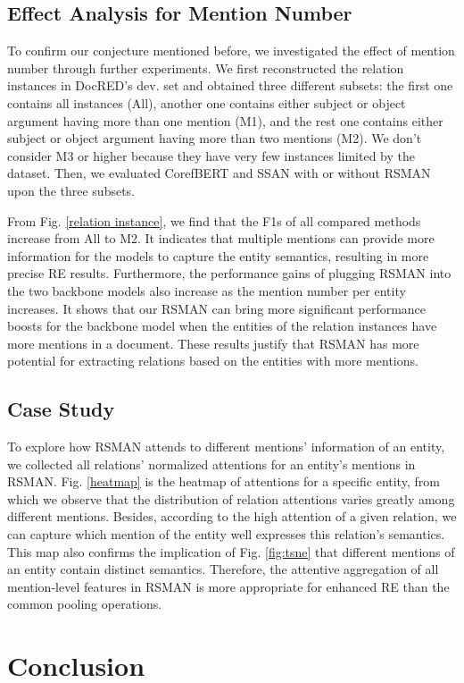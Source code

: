\documentclass[11pt]{article}
\begin{document}
\subsection{Effect Analysis for Mention Number}
To confirm our conjecture mentioned before, we investigated the effect of mention number through further experiments. We first reconstructed the relation instances in DocRED's dev. set and obtained three different subsets: the first one contains all instances (All), another one contains either subject or object argument having more than one mention (M1), and the rest one contains either subject or object argument having more than two mentions (M2). We don't consider M3 or higher because they have very few instances limited by the dataset. Then, we evaluated CorefBERT and SSAN with or without RSMAN upon the three subsets.

From Fig. \ref{relation instance}, we find that the F1s of all compared methods increase from All to M2. It indicates that multiple mentions can provide more information for the models to capture the entity semantics, resulting in more precise RE results. Furthermore, the performance gains of plugging RSMAN into the two backbone models also increase as the mention number per entity increases. It shows that our RSMAN can bring more significant performance boosts for the backbone model when the entities of the relation instances have more mentions in a document. These results justify that RSMAN has more potential for extracting relations based on the entities with more mentions.

\subsection{Case Study}
To explore how RSMAN attends to different mentions' information of an entity, we collected all relations' normalized attentions for an entity's mentions in RSMAN. Fig. \ref{heatmap} is the heatmap of attentions for a specific entity, from which we observe that the distribution of relation attentions varies greatly among different mentions. Besides, according to the high attention of a given relation, we can capture which mention of the entity well expresses this relation's semantics. This map also confirms the implication of Fig. \ref{fig:tsne} that different mentions of an entity contain distinct semantics. Therefore, the attentive aggregation of all mention-level features in RSMAN is more appropriate for enhanced RE than the common pooling operations.


\section{Conclusion}
\end{document}
